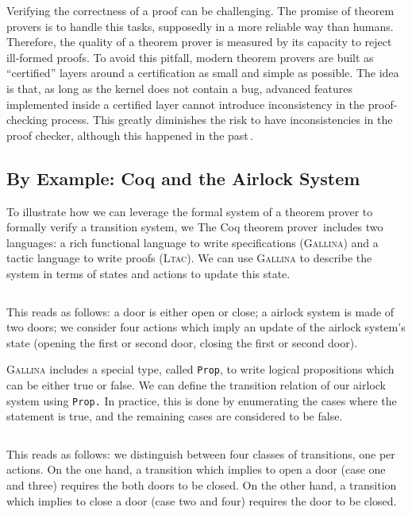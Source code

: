 \documentclass[oneside,a4paper]{memoir}
\theoremstyle{break}
\begin{document}
Verifying the correctness of a proof can be challenging.
%
The promise of theorem provers is to handle this tasks, supposedly in a more
reliable way than humans.
%
Therefore, the quality of a theorem prover is measured by its capacity to reject
ill-formed proofs.
%
To avoid this pitfall, modern theorem provers are built as ``certified'' layers
around a certification as small and simple as possible.
%
The idea is that, as long as the kernel does not contain a bug, advanced
features implemented inside a certified layer cannot introduce inconsistency in
the proof-checking process.
%
This greatly diminishes the risk to have inconsistencies in the proof checker,
although this happened in the
past\,\cite{claret2015falso,griffioen1998comparison}.

\subsection{By Example: Coq and the Airlock System}

To illustrate how we can leverage the formal system of a theorem prover to
formally verify a transition system, we
%
The Coq theorem prover\,\cite{coq} includes two languages: a rich functional
language to write specifications ({\scshape Gallina}) and a tactic language to
write proofs ({\scshape Ltac}).
We can use {\scshape Gallina} to describe the system in terms of states and
actions to update this state.

\inputminted[firstline=1,lastline=14]{coq}{Listings/Airlock.v}

This reads as follows: a door is either open or close; a airlock system is made
of two doors; we consider four actions which imply an update of the airlock
system's state (opening the first or second door, closing the first or second
door).

{\scshape Gallina} includes a special type, called \texttt{Prop}, to write
logical propositions which can be either true or false.
%
We can define the transition relation of our airlock system using \texttt{Prop.}
%
In practice, this is done by enumerating the cases where the statement is true,
and the remaining cases are considered to be false.

\inputminted[firstline=16,lastline=33]{coq}{Listings/Airlock.v}

This reads as follows: we distinguish between four classes of transitions, one
per actions.
%
On the one hand, a transition which implies to open a door (case one and three)
requires the both doors to be closed.
%
On the other hand, a transition which implies to close a door (case two and
four) requires the door to be closed.
\end{document}
